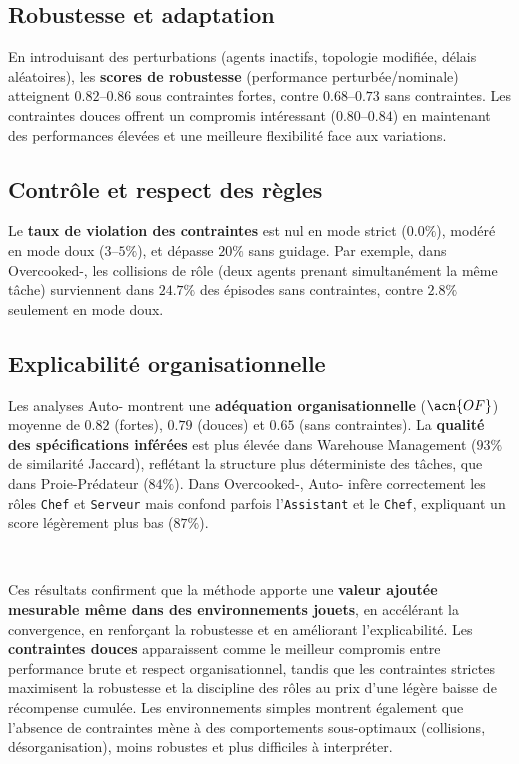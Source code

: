 \subsection*{Robustesse et adaptation}

En introduisant des perturbations (agents inactifs, topologie modifiée, délais aléatoires), les \textbf{scores de robustesse} (performance perturbée/nominale) atteignent $0.82$–$0.86$ sous contraintes fortes, contre $0.68$–$0.73$ sans contraintes.
Les contraintes douces offrent un compromis intéressant ($0.80$–$0.84$) en maintenant des performances élevées et une meilleure flexibilité face aux variations.

\subsection*{Contrôle et respect des règles}

Le \textbf{taux de violation des contraintes} est nul en mode strict ($0.0\%$), modéré en mode doux ($3$–$5\%$), et dépasse $20\%$ sans guidage.
Par exemple, dans Overcooked-, les collisions de rôle (deux agents prenant simultanément la même tâche) surviennent dans $24.7\%$ des épisodes sans contraintes, contre $2.8\%$ seulement en mode doux.

\subsection*{Explicabilité organisationnelle}

Les analyses Auto- montrent une \textbf{adéquation organisationnelle} ($\acn{OF}$) moyenne de $0.82$ (fortes), $0.79$ (douces) et $0.65$ (sans contraintes).
La \textbf{qualité des spécifications inférées} est plus élevée dans Warehouse Management ($93\%$ de similarité Jaccard), reflétant la structure plus déterministe des tâches, que dans Proie-Prédateur ($84\%$).
Dans Overcooked-, Auto- infère correctement les rôles \texttt{Chef} et \texttt{Serveur} mais confond parfois l’\texttt{Assistant} et le \texttt{Chef}, expliquant un score légèrement plus bas ($87\%$).

\

Ces résultats confirment que la méthode  apporte une \textbf{valeur ajoutée mesurable même dans des environnements jouets}, en accélérant la convergence, en renforçant la robustesse et en améliorant l’explicabilité.
Les \textbf{contraintes douces} apparaissent comme le meilleur compromis entre performance brute et respect organisationnel, tandis que les contraintes strictes maximisent la robustesse et la discipline des rôles au prix d’une légère baisse de récompense cumulée.
Les environnements simples montrent également que l’absence de contraintes mène à des comportements sous-optimaux (collisions, désorganisation), moins robustes et plus difficiles à interpréter.


